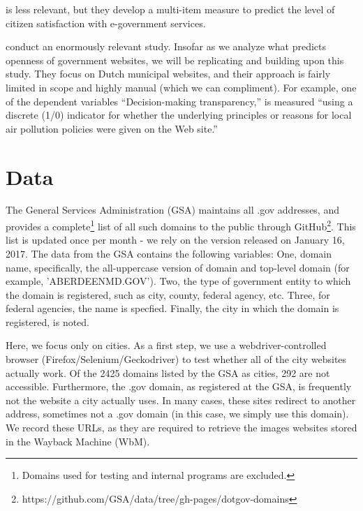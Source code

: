 \documentclass[11pt]{article}
\begin{document}
\cite{osman2014cobra} is less relevant, but they develop a multi-item measure to predict the level of citizen satisfaction with e-government services. 


\cite{grimmelikhuijsen2012developing} conduct an enormously relevant study. Insofar as we analyze what predicts openness of government websites, we will be replicating and building upon this study. They focus on Dutch municipal websites, and their approach is fairly limited in scope and highly manual (which we can compliment). For example, one of the dependent variables ``Decision-making transparency,'' is measured ``using a discrete (1/0) indicator for whether the underlying principles or reasons for local air pollution policies were given on the Web site.'' 


\section{Data}
The General Services Administration (GSA) maintains all .gov addresses, and provides a complete\footnote{Domains used for testing and internal programs are excluded.} list of all such domains to the public through GitHub\footnote{https://github.com/GSA/data/tree/gh-pages/dotgov-domains}. This list is updated once per month - we rely on the version released on January 16, 2017. The data from the GSA contains the following variables: One, domain name, specifically, the all-uppercase version of domain and top-level domain (for example, 'ABERDEENMD.GOV'). Two, the type of government entity to which the domain is registered, such as city, county, federal agency, etc. Three, for federal agencies, the name is specfied. Finally, the city in which the domain is registered, is noted.

Here, we focus only on cities. As a first step, we use a webdriver-controlled browser (Firefox/Selenium/Geckodriver) to test whether all of the city websites actually work. Of the 2425 domains listed by the GSA as cities, 292 are not accessible. Furthermore, the .gov domain, as registered at the GSA, is frequently not the website a city actually uses. In many cases, these sites redirect to another address, sometimes not a .gov domain (in this case, we simply use this domain). We record these URLs, as they are required to retrieve the images websites stored in the Wayback Machine (WbM).
\end{document}

